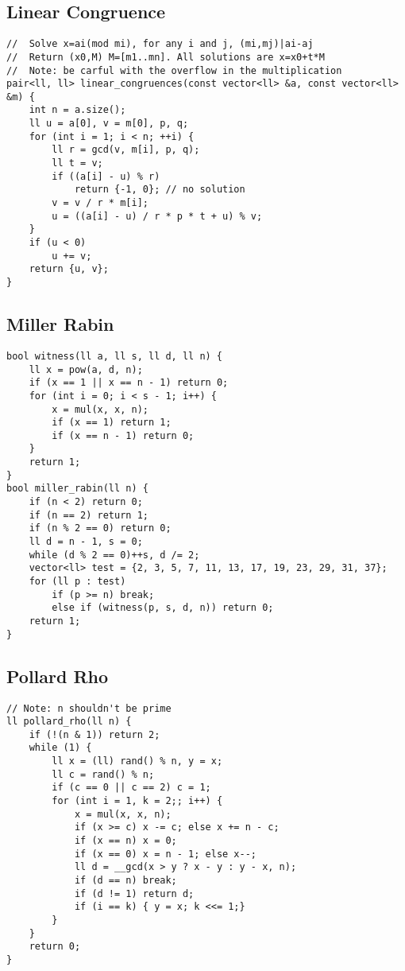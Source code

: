 \documentclass[landscape, 8pt, a4paper, oneside]{extarticle}
\begin{document}
\begin{multicols}{3}
\subsection{Linear Congruence}
\begin{verbatim}
//	Solve x=ai(mod mi), for any i and j, (mi,mj)|ai-aj
//	Return (x0,M) M=[m1..mn]. All solutions are x=x0+t*M
//	Note: be carful with the overflow in the multiplication
pair<ll, ll> linear_congruences(const vector<ll> &a, const vector<ll> &m) {
    int n = a.size();
    ll u = a[0], v = m[0], p, q;
    for (int i = 1; i < n; ++i) {
        ll r = gcd(v, m[i], p, q);
        ll t = v;
        if ((a[i] - u) % r)
            return {-1, 0}; // no solution
        v = v / r * m[i];
        u = ((a[i] - u) / r * p * t + u) % v;
    }
    if (u < 0)
        u += v;
    return {u, v};
}
\end{verbatim}
\subsection{Miller Rabin}
\begin{verbatim}
bool witness(ll a, ll s, ll d, ll n) {
    ll x = pow(a, d, n);
    if (x == 1 || x == n - 1) return 0;
    for (int i = 0; i < s - 1; i++) {
        x = mul(x, x, n);
        if (x == 1) return 1;
        if (x == n - 1) return 0;
    }
    return 1;
}
bool miller_rabin(ll n) {
    if (n < 2) return 0;
    if (n == 2) return 1;
    if (n % 2 == 0) return 0;
    ll d = n - 1, s = 0;
    while (d % 2 == 0)++s, d /= 2;
    vector<ll> test = {2, 3, 5, 7, 11, 13, 17, 19, 23, 29, 31, 37};
    for (ll p : test)
        if (p >= n) break;
        else if (witness(p, s, d, n)) return 0;
    return 1;
}
\end{verbatim}
\subsection{Pollard Rho}
\begin{verbatim}
// Note: n shouldn't be prime
ll pollard_rho(ll n) {
    if (!(n & 1)) return 2;
    while (1) {
        ll x = (ll) rand() % n, y = x;
        ll c = rand() % n;
        if (c == 0 || c == 2) c = 1;
        for (int i = 1, k = 2;; i++) {
            x = mul(x, x, n);
            if (x >= c) x -= c; else x += n - c;
            if (x == n) x = 0;
            if (x == 0) x = n - 1; else x--;
            ll d = __gcd(x > y ? x - y : y - x, n);
            if (d == n) break;
            if (d != 1) return d;
            if (i == k) { y = x; k <<= 1;}
        }
    }
    return 0;
}
\end{verbatim}

\end{multicols}
\end{document}
